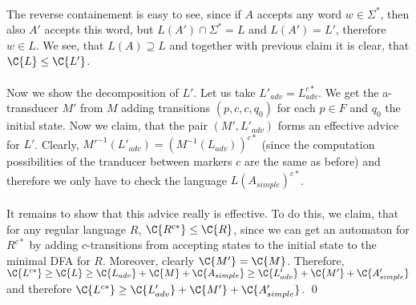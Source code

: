 \paragraph{}
The reverse containement is easy to see, since if $A$ accepts any word $w \in \Sigma^*$, then also $A'$ accepts this word, but $L(A') \cap \Sigma^* = L$ and $L(A') = L'$, therefore $w \in L$. We see, that  $L(A) \supseteq L$ and together with previous claim it is clear, that $\C{L} \leq \C{L'}$.

\paragraph{}
Now we show the decomposition of $L'$. Let us take $L'_{adv} = L_{adv}^{c*}$. We get the a-transducer $M'$ from $M$ adding transitions $(p, c, c, q_0)$ for each $p \in F$ and $q_0$ the initial state. Now we claim, that the pair $(M', L'_{adv})$ forms an effective advice for $L'$. Clearly, $M'^{-1}(L'_{adv}) = (M^{-1}(L_{adv}))^{c*}$ (since the computation possibilities of the tranducer between markers $c$ are the  same as before) and therefore we only have to check the language $L(A_{simple})^{c*}$.

\paragraph{}
It remains to show that this advice really is effective. To do this, we claim, that for any regular language $R$, $\C{R^{c*}} \leq \C{R}$, since we can get an automaton for $R^{c*}$ by adding $c$-transitions from accepting states to the initial state to the minimal DFA for $R$. Moreover, clearly $\C{M'} = \C{M}$. Therefore, $\C{L^{c*}} \geq \C{L} \geq \C{L_{adv}} + \C{M} + \C{A_{simple}} \geq \C{L'_{adv}} + \C{M'} + \C{A'_{simple}}$ and therefore $\C{L^{c*}} \geq \C{L'_{adv}} + \C{M'} + \C{A'_{simple}}$. \qed
